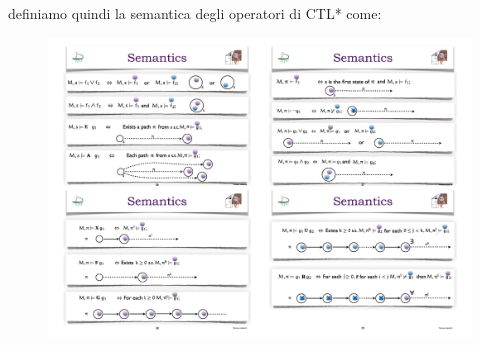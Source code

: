 \documentclass[a4paper,oneside,titlepage]{book}
\begin{document}
\noindent
definiamo quindi la semantica degli operatori di CTL* come:
\begin{figure}[htp]
	\centering
	\includegraphics[width=\textwidth, height=\textheight, keepaspectratio]{ctl5.png}
\end{figure}
\end{document}
